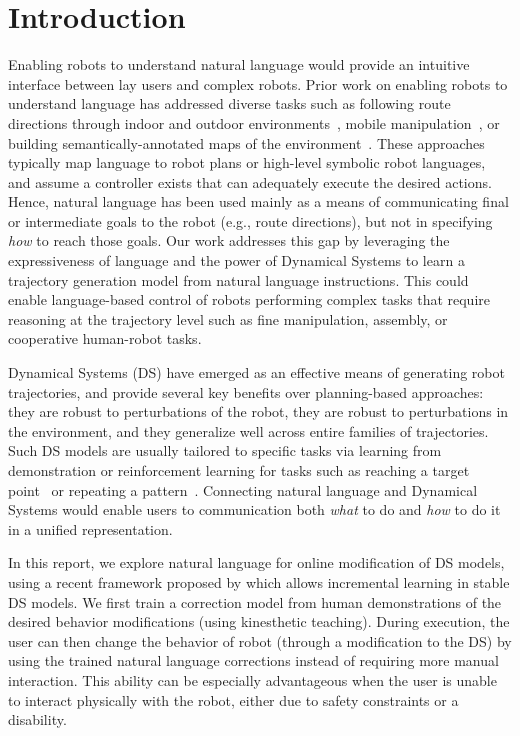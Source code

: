 \section{Introduction}
\label{secIntroduction}

Enabling robots to understand natural language would provide an intuitive interface between lay users and complex robots.
Prior work on enabling robots to understand language has addressed diverse tasks such as following route directions through indoor and outdoor environments~\cite{macmahon06, kollar10, matuszek12a, duvallet13, boularias15}, mobile manipulation~\cite{tellex11, howard14a}, or building semantically-annotated maps of the environment~\cite{walter13}.
These approaches typically map language to robot plans or high-level symbolic robot languages, and assume a controller exists that can adequately execute the desired actions.
Hence, natural language has been used mainly as a means of communicating final or intermediate goals to the robot (e.g., route directions), but not in specifying \emph{how} to reach those goals.
Our work addresses this gap by leveraging the expressiveness of language and the power of Dynamical Systems to learn a trajectory generation model from natural language instructions.
This could enable language-based control of robots performing complex tasks that require reasoning at the trajectory level such as fine manipulation, assembly, or cooperative human-robot tasks.

Dynamical Systems (DS) have emerged as an effective means of generating robot trajectories, and provide several key benefits over planning-based approaches:
they are robust to perturbations of the robot,
they are robust to perturbations in the environment,
and they generalize well across entire families of trajectories.
Such DS models are usually tailored to specific tasks via learning from demonstration or reinforcement learning for tasks such as reaching a target point~\cite{KhansariZadeh2011,Calinon2012} or repeating a pattern~\cite{Buchli2006}.
Connecting natural language and Dynamical Systems would enable users to communication both \emph{what} to do and \emph{how} to do it in a unified representation.

In this report, we explore natural language for online modification of DS models, using a recent framework proposed by \citet{Kronander2015} which allows incremental learning in stable DS models.
We first train a correction model from human demonstrations of the desired behavior modifications (using kinesthetic teaching).
During execution, the user can then change the behavior of robot (through a modification to the DS) by using the trained natural language corrections instead of requiring more manual interaction.
This ability can be especially advantageous when the user is unable to interact physically with the robot, either due to safety constraints or a disability.

